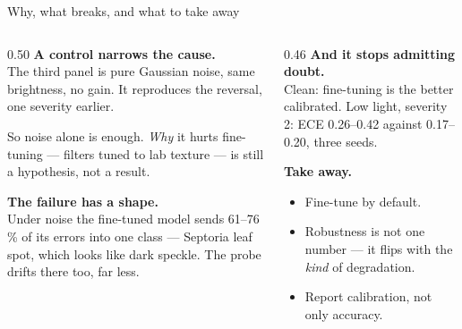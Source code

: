 \documentclass[aspectratio=169,12pt]{beamer}
\begin{document}
\begin{frame}{Why, what breaks, and what to take away}

\begin{columns}[T]
\begin{column}{0.50\textwidth}
\textbf{A control narrows the cause.}\\[3pt]
The third panel is pure Gaussian noise, same brightness, no gain. It reproduces the reversal, one
severity earlier.

\vspace{6pt}
So noise alone is enough. \emph{Why} it hurts fine-tuning --- filters tuned to lab texture --- is
still a hypothesis, not a result.

\vspace{14pt}
\textbf{The failure has a shape.}\\[3pt]
Under noise the fine-tuned model sends \alert{61--76\,\% of its errors into one class} ---
Septoria leaf spot, which looks like dark speckle. The probe drifts there too, far less.
\end{column}

\begin{column}{0.46\textwidth}
\textbf{And it stops admitting doubt.}\\[3pt]
Clean: fine-tuning is the better calibrated. Low light, severity 2: ECE \alert{0.26--0.42 against
0.17--0.20}, three seeds.

\vspace{14pt}
\textbf{Take away.}
\begin{itemize}
  \item Fine-tune by default.
  \item Robustness is not one number --- it flips with the \emph{kind} of degradation.
  \item Report calibration, not only accuracy.
\end{itemize}
\end{column}
\end{columns}
\end{frame}
\end{document}
